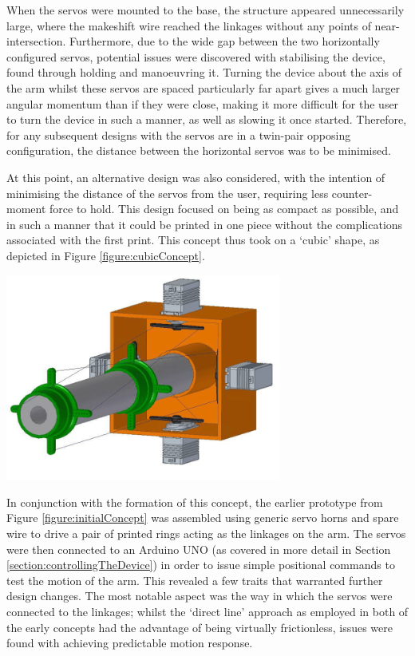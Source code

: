 \documentclass[11pt]{article}
\begin{document}
When the servos were mounted to the base, the structure appeared unnecessarily large, where the makeshift wire reached the linkages without any points of near-intersection. Furthermore, due to the wide gap between the two horizontally configured servos, potential issues were discovered with stabilising the device, found through holding and manoeuvring it. Turning the device about the axis of the arm whilst these servos are spaced particularly far apart gives a much larger angular momentum than if they were close, making it more difficult for the user to turn the device in such a manner, as well as slowing it once started. Therefore, for any subsequent designs with the servos are in a twin-pair opposing configuration, the distance between the horizontal servos was to be minimised.

At this point, an alternative design was also considered, with the intention of minimising the distance of the servos from the user, requiring less counter-moment force to hold. This design focused on being as compact as possible, and in such a manner that it could be printed in one piece without the complications associated with the first print. This concept thus took on a `cubic' shape, as depicted in Figure \ref{figure:cubicConcept}.

\begin{center}
\includegraphics[width=0.68\textwidth]{images/cubicConcept.png}
\label{figure:cubicConcept}
\end{center}

In conjunction with the formation of this concept, the earlier prototype from Figure \ref{figure:initialConcept} was assembled using generic servo horns and spare wire to drive a pair of printed rings acting as the linkages on the arm. The servos were then connected to an Arduino UNO (as covered in more detail in Section \ref{section:controllingTheDevice}) in order to issue simple positional commands to test the motion of the arm. This revealed a few traits that warranted further design changes. The most notable aspect was the way in which the servos were connected to the linkages; whilst the `direct line' approach as employed in both of the early concepts had the advantage of being virtually frictionless, issues were found with achieving predictable motion response. 
\end{document}
